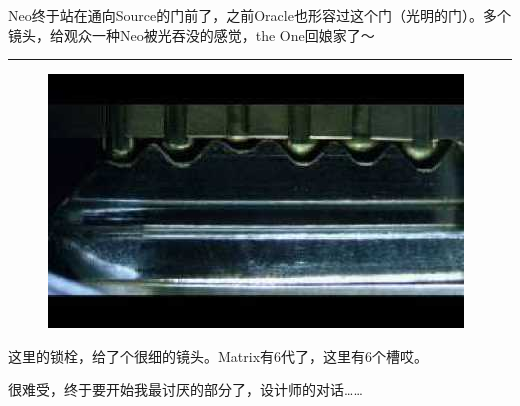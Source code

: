 \documentclass[UTF8]{ctexart}
\newcommand{\myparsep}{\noindent \rule[0.5ex]{\linewidth}{1pt}}
\begin{document}
Neo终于站在通向Source的门前了，之前Oracle也形容过这个门（光明的门）。多个镜头，给观众一种Neo被光吞没的感觉，the One回娘家了～

\myparsep

\begin{figure}[htb]
\centering
\includegraphics[width=0.5\linewidth]{fig/read_reloaded-155}
\end{figure}

这里的锁栓，给了个很细的镜头。Matrix有6代了，这里有6个槽哎。

很难受，终于要开始我最讨厌的部分了，设计师的对话……
\end{document}
